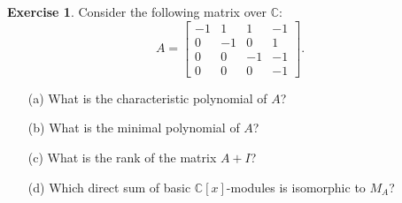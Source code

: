 \documentclass{amsart}
\newcommand{\bbm}       {\left[\begin{matrix}}
\newcommand{\ebm}       {\end{matrix}\right]}
\newcommand{\C}         {{\mathbb{C}}}
\newcommand{\ip}[1]     {\langle #1\rangle}
\renewcommand{\:}{\colon}
\theoremstyle{definition}
\newtheorem{exercise}{Exercise}[section]
\begin{document}
\begin{exercise}
 Consider the following matrix over $\C$: 
 \[ A = \bbm -1&1&1&-1 \\ 0&-1&0&1 \\ 0&0&-1&-1 \\ 0&0&0&-1 \ebm.  \]
 \begin{itemize}
  \item[(a)] What is the characteristic polynomial of $A$?
  \item[(b)] What is the minimal polynomial of $A$?
  \item[(c)] What is the rank of the matrix $A+I$?
  \item[(d)] Which direct sum of basic $\C[x]$-modules is isomorphic
   to $M_A$?
 \end{itemize}
\end{exercise}
\end{document}
